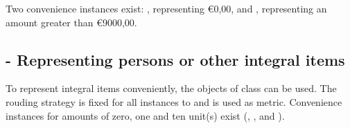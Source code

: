 Two convenience instances exist: , representing \euro{0,00}, and , representing an amount greater than \euro{9000,00}.

\subsection{ - Representing persons or other integral items}
To represent integral items conveniently, the objects of class  can be used.
The rouding strategy is fixed for all instances to  and  is used as metric.
Convenience instances for amounts of zero, one and ten unit(s) exist (, , and ).

